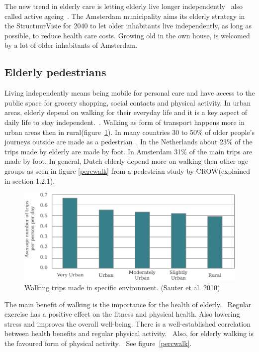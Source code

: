 The new trend in elderly care is letting elderly live longer independently~\cite{MENSenSTRAAT2014, VandeRidder2008} also called active ageing~\cite{Annear2014}. The Amsterdam municipality aims its elderly strategy in the StructuurVisie for 2040 to let older inhabitants live independently, as long as possible, to reduce health care costs. Growing old in the own house, is welcomed by a lot of older inhabitants of Amsterdam.~\cite{Bossink2011}

\subsection{Elderly pedestrians}
Living independently means being mobile for personal care and have access to the public space for grocery shopping, social contacts and physical activity. In urban areas, elderly depend on walking for their everyday life and it is a key aspect of daily life to stay independent.~\cite{OECD2001}. Walking as form of transport happens more in urban areas then in rural(figure~\ref{walktrip}).
In many countries 30 to 50\% of older people's journeys outside are made as a pedestrian~\cite{Stahl2013}. In the Netherlands about 23\% of the trips made by elderly are made by foot. In Amsterdam 31\% of the main trips are made by foot. In general, Dutch elderly depend more on walking then other age groups as seen in figure \ref{percwalk} from a pedestrian study by CROW(explained in section 1.2.1).~\cite{Eijnde2011, Sauter2010, Crow2014}

\begin{figure}[h]
\includegraphics[width=\textwidth]{img/I2_urbanwalks.pdf}
\centering
\caption[Walking trips made in specific environment.]{Walking trips made in specific environment. (Sauter et al. 2010)
\label{walktrip}} 
\end{figure}

The main benefit of walking is the importance for the health of elderly.~\cite{Borst2008} Regular exercise has a positive effect on the fitness and physical health. Also lowering stress and improves the overall well-being. There is a well-established correlation between health benefits and regular physical activity.~\cite{Annear2014} Also, for elderly walking is the favoured form of physical activity.~\cite{Borst2008} See figure~\ref{percwalk}.

